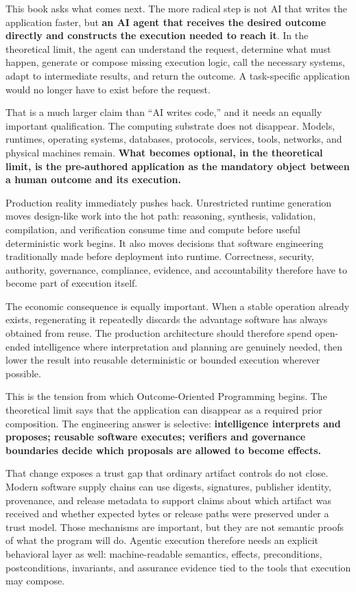 \documentclass[10pt,oneside,openany]{book}
\begin{document}
This book asks what comes next. The more radical step is not AI that writes the application faster, but \textbf{an AI agent that receives the desired outcome directly and constructs the execution needed to reach it}. In the theoretical limit, the agent can understand the request, determine what must happen, generate or compose missing execution logic, call the necessary systems, adapt to intermediate results, and return the outcome. A task-specific application would no longer have to exist before the request.

That is a much larger claim than ``AI writes code,'' and it needs an equally important qualification. The computing substrate does not disappear. Models, runtimes, operating systems, databases, protocols, services, tools, networks, and physical machines remain. \textbf{What becomes optional, in the theoretical limit, is the pre-authored application as the mandatory object between a human outcome and its execution.}

Production reality immediately pushes back. Unrestricted runtime generation moves design-like work into the hot path: reasoning, synthesis, validation, compilation, and verification consume time and compute before useful deterministic work begins. It also moves decisions that software engineering traditionally made before deployment into runtime. Correctness, security, authority, governance, compliance, evidence, and accountability therefore have to become part of execution itself.

The economic consequence is equally important. When a stable operation already exists, regenerating it repeatedly discards the advantage software has always obtained from reuse. The production architecture should therefore spend open-ended intelligence where interpretation and planning are genuinely needed, then lower the result into reusable deterministic or bounded execution wherever possible.

This is the tension from which Outcome-Oriented Programming begins. The theoretical limit says that the application can disappear as a required prior composition. The engineering answer is selective: \textbf{intelligence interprets and proposes; reusable software executes; verifiers and governance boundaries decide which proposals are allowed to become effects.}

That change exposes a trust gap that ordinary artifact controls do not close. Modern software supply chains can use digests, signatures, publisher identity, provenance, and release metadata to support claims about which artifact was received and whether expected bytes or release paths were preserved under a trust model. Those mechanisms are important, but they are not semantic proofs of what the program will do. Agentic execution therefore needs an explicit behavioral layer as well: machine-readable semantics, effects, preconditions, postconditions, invariants, and assurance evidence tied to the tools that execution may compose.
\end{document}
